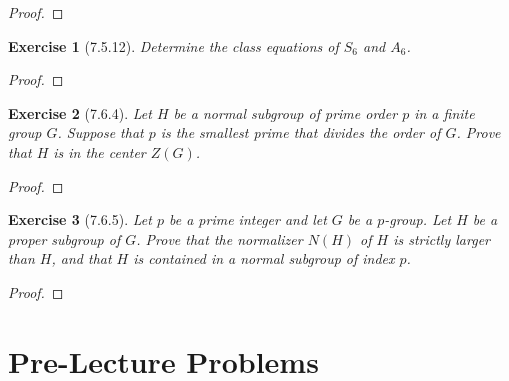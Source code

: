 \documentclass[12pt]{article}
\newtheorem*{exer}{Exercise}
\begin{document}
\begin{proof}

\end{proof}


\begin{exer}[7.5.12]

    Determine the class equations of $S_6$ and $A_6$.

\end{exer}

\begin{proof}

\end{proof}


\begin{exer}[7.6.4]

    Let $H$ be a normal subgroup of prime order $p$ in a finite group
    $G$. Suppose that $p$ is the smallest prime that divides the order
    of $G$. Prove that $H$ is in the center $Z(G)$.

\end{exer}

\begin{proof}

\end{proof}


\begin{exer}[7.6.5]

    Let $p$ be a prime integer and let $G$ be a $p$-group. Let $H$ be a
    proper subgroup of $G$. Prove that the normalizer $N(H)$ of $H$ is
    strictly larger than $H$, and that $H$ is contained in a normal
    subgroup of index $p$.

\end{exer}

\begin{proof}

\end{proof}


\section*{Pre-Lecture Problems}
\end{document}
